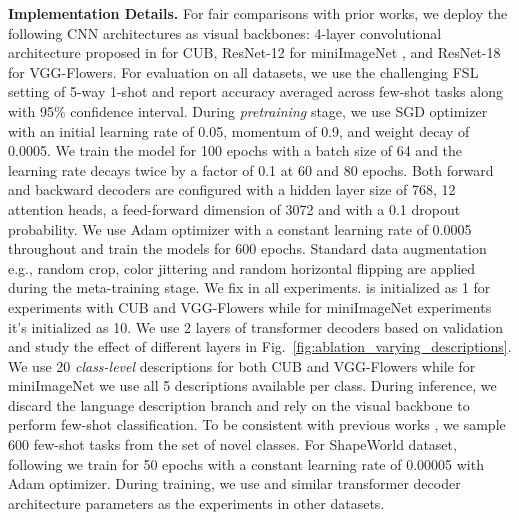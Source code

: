 \documentclass{bmvc2k}
\begin{document}
\noindent \textbf{Implementation Details.}
For fair comparisons with prior works,
we deploy the following CNN architectures as visual backbones: 4-layer convolutional architecture proposed in \cite{snell2017prototypical} for CUB, ResNet-12 for miniImageNet \cite{RFS, chen2020new, metaoptnet}, and ResNet-18 \cite{Su2020When} for VGG-Flowers. For evaluation on all datasets, we use the challenging FSL setting of 5-way 1-shot  and report accuracy averaged across few-shot tasks along with 95\% confidence interval. During \textit{pretraining} stage, we use SGD optimizer with an initial learning rate of 0.05, momentum of 0.9, and weight decay of 0.0005. We train the model for 100 epochs with a batch size of 64 and the learning rate decays twice by a factor of 0.1 at 60 and 80 epochs. 
Both forward and backward decoders are configured with a hidden layer size of 768, 12 attention heads, a feed-forward dimension of 3072 and with a 0.1 dropout probability.
We use Adam optimizer with a constant learning rate of 0.0005 throughout and train the models for 600 epochs. Standard data augmentation e.g., random crop, color jittering and random horizontal flipping are applied during the meta-training stage. We fix  in all experiments.  is initialized as 1 for experiments with CUB and VGG-Flowers while for miniImageNet experiments it's initialized as 10. We use 2 layers of transformer decoders based on validation and study the effect of different layers in Fig.~\ref{fig:ablation_varying_descriptions}. We use 20 \textit{class-level} descriptions for both CUB and VGG-Flowers while for miniImageNet we use all 5 descriptions available per class. During inference, we discard the language description branch and rely on the visual backbone to perform few-shot classification. To be consistent with previous works \cite{Chen2019ACL, Su2020When}, we sample 600 few-shot tasks from the set of novel classes.
For ShapeWorld dataset, following \cite{mu2020shaping} we train for 50 epochs with a constant learning rate of 0.00005 with Adam optimizer. During training, we use  and similar transformer decoder architecture parameters as the experiments in other datasets.  
\vspace{-0.4cm}
\end{document}
